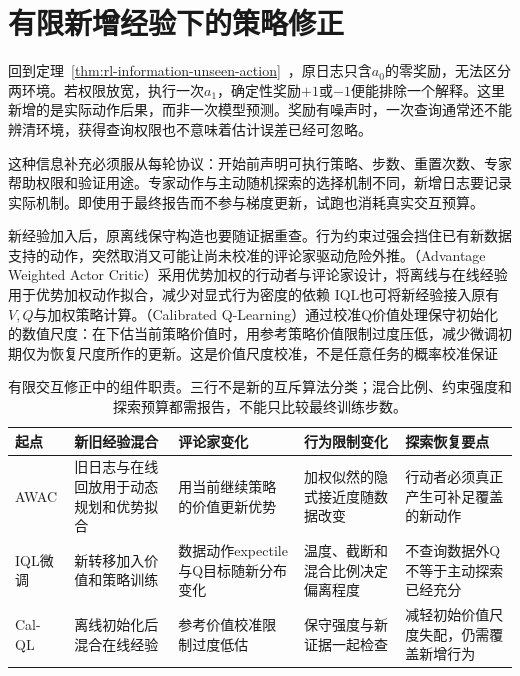\section{有限新增经验下的策略修正}
\label{sec:rl-information-limited-interaction}

回到定理~\ref{thm:rl-information-unseen-action}~，原日志只含$a_0$的零奖励，无法区分两环境。若权限放宽，执行一次$a_1$，确定性奖励$+1$或$-1$便能排除一个解释。这里新增的是实际动作后果，而非一次模型预测。奖励有噪声时，一次查询通常还不能辨清环境，获得查询权限也不意味着估计误差已经可忽略。

这种信息补充必须服从每轮协议：开始前声明可执行策略、步数、重置次数、专家帮助权限和验证用途。专家动作与主动随机探索的选择机制不同，新增日志要记录实际机制。即使用于最终报告而不参与梯度更新，试跑也消耗真实交互预算。

新经验加入后，原离线保守构造也要随证据重查。行为约束过强会挡住已有新数据支持的动作，突然取消又可能让尚未校准的评论家驱动危险外推。（Advantage Weighted Actor Critic）采用优势加权的行动者与评论家设计，将离线与在线经验用于优势加权动作拟合，减少对显式行为密度的依赖
IQL也可将新经验接入原有$V,Q$与加权策略计算。（Calibrated Q-Learning）通过校准Q价值处理保守初始化的数值尺度：在下估当前策略价值时，用参考策略价值限制过度压低，减少微调初期仅为恢复尺度所作的更新。这是价值尺度校准，不是任意任务的概率校准保证

\begin{table}[t]
  \centering
  \small
  \begin{tabularx}{\linewidth}{p{18mm}XXXX}
    \toprule
    起点 & 新旧经验混合 & 评论家变化 & 行为限制变化 & 探索恢复要点 \\
    \midrule
    AWAC & 旧日志与在线回放用于动态规划和优势拟合 & 用当前继续策略的价值更新优势 & 加权似然的隐式接近度随数据改变 & 行动者必须真正产生可补足覆盖的新动作 \\
    IQL微调 & 新转移加入价值和策略训练 & 数据动作expectile与Q目标随新分布变化 & 温度、截断和混合比例决定偏离程度 & 不查询数据外Q不等于主动探索已经充分 \\
    Cal-QL & 离线初始化后混合在线经验 & 参考价值校准限制过度低估 & 保守强度与新证据一起检查 & 减轻初始价值尺度失配，仍需覆盖新增行为 \\
    \bottomrule
  \end{tabularx}
  \caption{有限交互修正中的组件职责。三行不是新的互斥算法分类；混合比例、约束强度和探索预算都需报告，不能只比较最终训练步数。}
  \label{tab:rl-information-finetuning}
\end{table}

